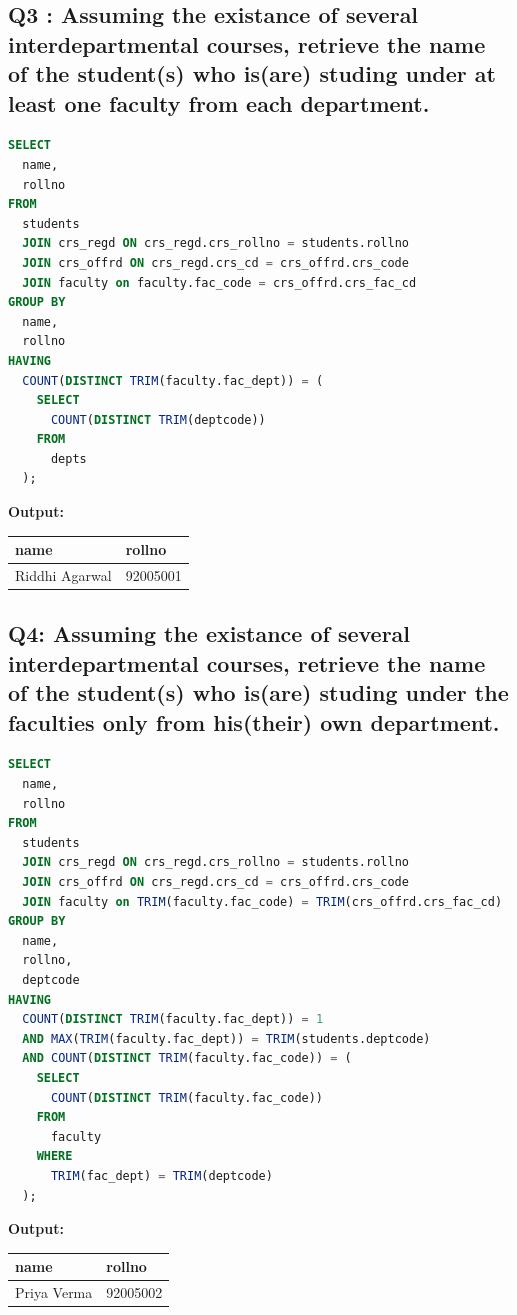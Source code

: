 \documentclass[11pt, a4paper]{article}
\begin{document}
\subsection*{Q3 : Assuming the existance of several interdepartmental courses, retrieve the name of the student(s) who is(are) studing under at least one faculty from each department.}
\begin{lstlisting}[language=SQL]
SELECT
  name,
  rollno
FROM
  students
  JOIN crs_regd ON crs_regd.crs_rollno = students.rollno
  JOIN crs_offrd ON crs_regd.crs_cd = crs_offrd.crs_code
  JOIN faculty on faculty.fac_code = crs_offrd.crs_fac_cd
GROUP BY
  name,
  rollno
HAVING
  COUNT(DISTINCT TRIM(faculty.fac_dept)) = (
    SELECT
      COUNT(DISTINCT TRIM(deptcode))
    FROM
      depts
  );
\end{lstlisting}
\vspace{0.3cm}
\textbf{Output:}\vspace{0.2cm}
\begin{center}
\begin{tabular}{|l|l|}
\hline
\textbf{name} & \textbf{rollno} \\ \hline
Riddhi Agarwal                 & 92005001 \\ \hline
\end{tabular}
\end{center}
\newpage
\subsection*{Q4: Assuming the existance of several interdepartmental courses, retrieve the name of the student(s) who is(are) studing under the faculties only from his(their) own department.}
\begin{lstlisting}[language=SQL]
SELECT
  name,
  rollno
FROM
  students
  JOIN crs_regd ON crs_regd.crs_rollno = students.rollno
  JOIN crs_offrd ON crs_regd.crs_cd = crs_offrd.crs_code
  JOIN faculty on TRIM(faculty.fac_code) = TRIM(crs_offrd.crs_fac_cd)
GROUP BY
  name,
  rollno,
  deptcode
HAVING
  COUNT(DISTINCT TRIM(faculty.fac_dept)) = 1
  AND MAX(TRIM(faculty.fac_dept)) = TRIM(students.deptcode)
  AND COUNT(DISTINCT TRIM(faculty.fac_code)) = (
    SELECT
      COUNT(DISTINCT TRIM(faculty.fac_code))
    FROM
      faculty
    WHERE
      TRIM(fac_dept) = TRIM(deptcode)
  );
\end{lstlisting}
\vspace{0.3cm}
\textbf{Output:}\vspace{0.2cm}
\begin{center}
\begin{tabular}{|l|l|}
\hline
\textbf{name} & \textbf{rollno} \\ \hline
Priya Verma                    & 92005002 \\ \hline
\end{tabular}
\end{center}
\newpage
\end{document}
